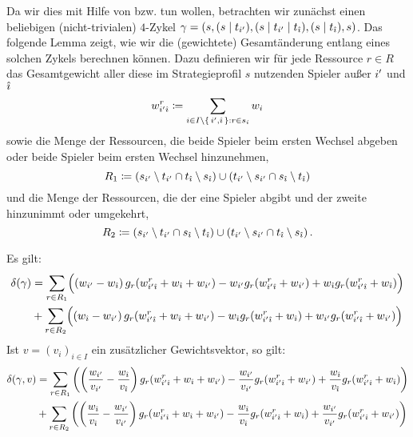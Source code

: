 Da wir dies mit Hilfe von  bzw.  tun wollen, betrachten wir zunächst einen beliebigen (nicht-trivialen) $4$-Zykel $\gamma = (s, (s\mid t_{i'}), (s \mid t_{i'} \mid t_{\hat{\imath}}), (s \mid t_{\hat{\imath}}), s)$. Das folgende Lemma zeigt, wie wir die (gewichtete) Gesamtänderung entlang eines solchen Zykels berechnen können. Dazu definieren wir für jede Ressource $r \in R$ das Gesamtgewicht aller diese im Strategieprofil $s$ nutzenden Spieler außer ${i'}$ und ${\hat{\imath}}$
	\[{w^r_{{i'}{\hat{\imath}}}} \coloneqq \sum_{i \in I\setminus\set{{i'}, {\hat{\imath}}}: r \in s_i} w_i \]
sowie die Menge der Ressourcen, die beide Spieler beim ersten Wechsel abgeben oder beide Spieler beim ersten Wechsel hinzunehmen,
	\[R_1 \coloneqq \left(s_{i'} \setminus t_{i'} \cap t_{\hat{\imath}} \setminus s_{\hat{\imath}}\right) \cup \left(t_{i'} \setminus s_{i'} \cap s_{\hat{\imath}} \setminus t_{\hat{\imath}}\right) \]
und die Menge der Ressourcen, die der eine Spieler abgibt und der zweite hinzunimmt oder umgekehrt,
	\[R_2 \coloneqq \left(s_{i'} \setminus t_{i'} \cap s_{\hat{\imath}} \setminus t_{\hat{\imath}}\right) \cup \left(t_{i'} \setminus s_{i'} \cap t_{\hat{\imath}} \setminus s_{\hat{\imath}}\right).\]	

\begin{lemma}\label{lemma:PfadAenderungen}
	Es gilt:
		\begin{align}\begin{split}  \label{eq:PfadAendUngew}
			\delta(\gamma) &= \sum_{r \in R_1} \Bigl(\left(w_{i'} - w_{\hat{\imath}}\right) g_r({w^r_{{i'}{\hat{\imath}}}} + w_{\hat{\imath}} + w_{i'}) - w_{i'} g_r({w^r_{{i'}{\hat{\imath}}}} + w_{i'})  + w_{\hat{\imath}} g_r({w^r_{{i'}{\hat{\imath}}}} + w_{\hat{\imath}})\Bigr) \\
			&+ \sum_{r \in R_2} \Bigl(\left(w_{\hat{\imath}} - w_{i'}\right) g_r({w^r_{{i'}{\hat{\imath}}}} + w_{\hat{\imath}} + w_{i'}) - w_{\hat{\imath}} g_r({w^r_{{i'}{\hat{\imath}}}} + w_{\hat{\imath}}) + w_{i'} g_r({w^r_{{i'}{\hat{\imath}}}} + w_{i'})\Bigr)
		\end{split}\end{align}
	Ist $v = (v_i)_{i \in I}$ ein zusätzlicher Gewichtsvektor, so gilt:
		\begin{align}\begin{split}\label{eq:PfadAendGew}
			\delta(\gamma, v) &= \sum_{r \in R_1} \left(\left(\frac{w_{i'}}{v_{i'}} - \frac{w_{\hat{\imath}}}{v_{\hat{\imath}}}\right) g_r({w^r_{{i'}{\hat{\imath}}}} + w_{\hat{\imath}} + w_{i'}) - \frac{w_{i'}}{v_{i'}} g_r({w^r_{{i'}{\hat{\imath}}}} + w_{i'})  + \frac{w_{\hat{\imath}}}{v_{\hat{\imath}}} g_r({w^r_{{i'}{\hat{\imath}}}} + w_{\hat{\imath}})\right) \\
								&+ \sum_{r \in R_2} \left(\left(\frac{w_{\hat{\imath}}}{v_{\hat{\imath}}} - \frac{w_{i'}}{v_{i'}}\right) g_r({w^r_{{i'}{\hat{\imath}}}} + w_{\hat{\imath}} + w_{i'}) - \frac{w_{\hat{\imath}}}{v_{\hat{\imath}}} g_r({w^r_{{i'}{\hat{\imath}}}} + w_{\hat{\imath}}) + \frac{w_{i'}}{v_{i'}} g_r({w^r_{{i'}{\hat{\imath}}}} + w_{i'})\right)
		\end{split}\end{align}
\end{lemma}


